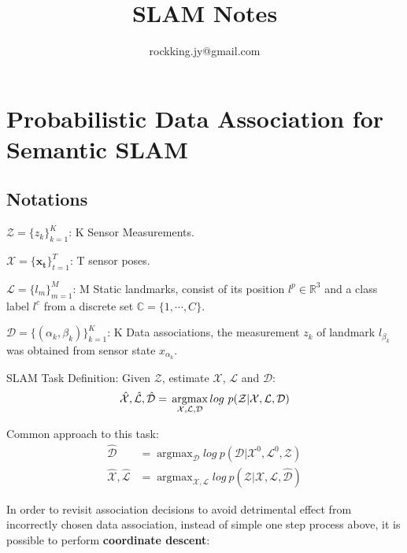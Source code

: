 \documentclass[12pt]{article}
\DeclareMathOperator*{\argmax}{argmax} %
\numberwithin{equation}{section}
\begin{document}
\small
\title{SLAM Notes}
\author{rockking.jy@gmail.com}
\pagestyle{fancy}\fancyhf{}
\lhead{}
\lfoot{\textit{}}\cfoot{}\rfoot{\thepage}
\renewcommand{\headrulewidth}{1.pt}
\renewcommand{\footrulewidth}{1.pt}
\maketitle
\tableofcontents
\section{Probabilistic Data Association for Semantic SLAM \cite{bowman2017probabilistic}}
\subsection{Notations}
$\mathcal{Z}=\{z_k\}^K_{k=1}$: K Sensor Measurements. \par
$\mathcal{X}=\{\bm{x_t}\}^T_{t=1}$: T sensor poses. \par
$\mathcal{L}=\{l_m\}^M_{m=1}$: M Static landmarks, consist of its position $l^p \in \mathbb{R}^3$ and a class label $l^c$ from a discrete set $\mathbb{C}=\{1, \cdots , C\}$. \par
$\mathcal{D}=\{(\alpha_k, \beta_k)\}^K_{k=1}$: K Data associations, the measurement $z_k$ of landmark $l_{\beta_k}$ was obtained from sensor state $x_{\alpha_k}$. \par
SLAM Task Definition: Given $\mathcal{Z}$, estimate $\mathcal{X}$, $\mathcal{L}$ and $\mathcal{D}$:
\begin{equation}
	\hat{\mathcal{X}}, \hat{\mathcal{L}}, \hat{\mathcal{D}} = \\
		\argmax_{\mathcal{X},\mathcal{L},\mathcal{D}} log\ p(\mathcal{Z}|\mathcal{X},\mathcal{L},\mathcal{D})
\end{equation} \par
Common approach to this task:
\begin{subequations}
\begin{align}
	\hat{\mathcal{D}} &= 
		\argmax_{\mathcal{D}} log\ p(\mathcal{D}|\mathcal{X}^0,\mathcal{L}^0,\mathcal{Z}) \\
	\hat{\mathcal{X}}, \hat{\mathcal{L}} &= 
		\argmax_{\mathcal{X},\mathcal{L}} log\ p(\mathcal{Z}|\mathcal{X},\mathcal{L},\hat{\mathcal{D}})
\end{align}
\end{subequations} \par
In order to revisit association decisions to avoid detrimental effect from incorrectly chosen data association, instead of simple one step process above, it is possible to perform \textbf{coordinate descent}:
\end{document}

